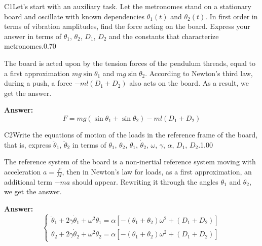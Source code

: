 \documentclass[11pt,a4paper]{article}
\begin{document}
\begin{solcard}{C1}{Let's start with an auxiliary task. Let the metronomes stand on a stationary board and oscillate with known dependencies $\theta_1(t)$ and $\theta_2(t)$. In first order in terms of vibration amplitudes, find the force acting on the board. Express your answer in terms of $\theta_1$, $\theta_2$, $D_1$, $D_2$ and the constants that characterize metronomes.}{0.70}

The board is acted upon by the tension forces of the pendulum threads, equal to a first approximation $mg\sin\theta_1$ and $mg\sin\theta_2$. According to Newton's third law, during a push, a force $-ml(D_1+D_2)$ also acts on the board. As a result, we get the answer.

\par\smallskip\noindent\textbf{Answer:} \[F=mg(\sin\theta_1+\sin\theta_2)-ml(D_1+D_2)\]
\end{solcard}

\begin{solcard}{C2}{Write the equations of motion of the loads in the reference frame of the board, that is, express $\ddot{\theta}_1$, $\ddot{\theta}_2$ in terms of $\theta_1$, $\theta_2$, $\dot{\theta}_1$, $\dot{\theta}_2$, $\omega$, $\gamma$, $\alpha$, $D_1$, $D_2$.}{1.00}

The reference system of the board is a non-inertial reference system moving with acceleration $a=\frac FM$, then in Newton’s law for loads, as a first approximation, an additional term $-ma$ should appear. Rewriting it through the angles $\theta_1$ and $\theta_2$, we get the answer.

\par\smallskip\noindent\textbf{Answer:} \[\begin{cases}\ddot\theta_1+2\gamma\dot\theta_1+\omega^2\theta_1=\alpha\left[-(\theta_1+\theta_2)\omega^2+(D_1+D_2)\right]\\\ddot\theta_2+2\gamma\dot\theta_2+\omega^2\theta_2=\alpha\left[-(\theta_1+\theta_2)\omega^2+(D_1+D_2)\right]\end{cases}\]
\end{solcard}
\end{document}
